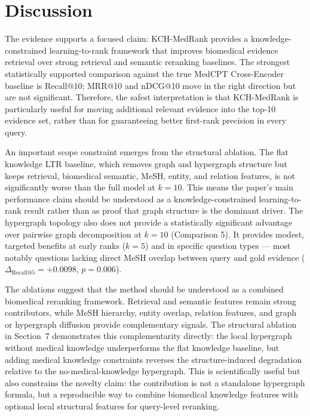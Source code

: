 \section{Discussion}

The evidence supports a focused claim: KCH-MedRank provides a knowledge-constrained learning-to-rank framework that improves biomedical evidence retrieval over strong retrieval and semantic reranking baselines. The strongest statistically supported comparison against the true MedCPT Cross-Encoder baseline is Recall@10; MRR@10 and nDCG@10 move in the right direction but are not significant. Therefore, the safest interpretation is that KCH-MedRank is particularly useful for moving additional relevant evidence into the top-10 evidence set, rather than for guaranteeing better first-rank precision in every query.

An important scope constraint emerges from the structural ablation. The flat knowledge LTR baseline, which removes graph and hypergraph structure but keeps retrieval, biomedical semantic, MeSH, entity, and relation features, is not significantly worse than the full model at $k{=}10$. This means the paper's main performance claim should be understood as a knowledge-constrained learning-to-rank result rather than as proof that graph structure is the dominant driver. The hypergraph topology also does not provide a statistically significant advantage over pairwise graph decomposition at $k{=}10$ (Comparison 5). It provides modest, targeted benefits at early ranks ($k{=}5$) and in specific question types — most notably questions lacking direct MeSH overlap between query and gold evidence ($\Delta_{\text{Recall@5}} = +0.0098$, $p{=}0.006$).

The ablations suggest that the method should be understood as a combined biomedical reranking framework. Retrieval and semantic features remain strong contributors, while MeSH hierarchy, entity overlap, relation features, and graph or hypergraph diffusion provide complementary signals. The structural ablation in Section~7 demonstrates this complementarity directly: the local hypergraph without medical knowledge underperforms the flat knowledge baseline, but adding medical knowledge constraints reverses the structure-induced degradation relative to the no-medical-knowledge hypergraph. This is scientifically useful but also constrains the novelty claim: the contribution is not a standalone hypergraph formula, but a reproducible way to combine biomedical knowledge features with optional local structural features for query-level reranking.

